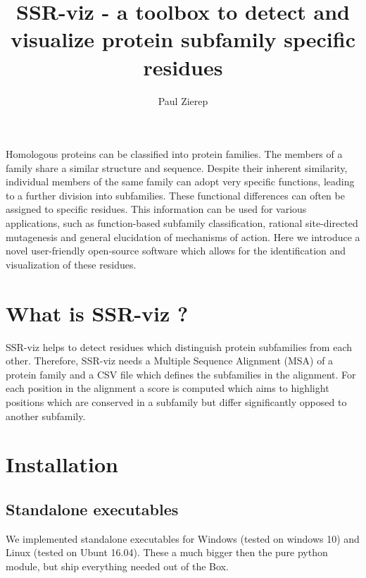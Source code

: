\documentclass[a4paper,10pt]{article}
\title{SSR-viz - a toolbox to detect and visualize protein
subfamily specific residues}
\author{Paul Zierep}
\begin{document}
\maketitle

\begin{abstract}


\end{abstract}

Homologous proteins can be classified into protein families. The members of a family share a similar structure and sequence. Despite their inherent
similarity, individual members of the same family can adopt very specific functions, leading to a further division into subfamilies. These functional
differences can often be assigned to specific residues. This information can be used for various applications, such as function-based subfamily
classification, rational site-directed mutagenesis and general elucidation of mechanisms of action. Here we introduce a novel user-friendly open-source
software which allows for the identification and visualization of these residues.

\pagebreak
\tableofcontents
\pagebreak

\section{What is SSR-viz ?}

SSR-viz helps to detect residues which distinguish protein subfamilies from each other.
Therefore, SSR-viz needs a Multiple Sequence Alignment (MSA) of a protein family and a CSV file which defines the 
subfamilies in the alignment.
For each position in the alignment a score is computed which aims to highlight positions which are conserved in a 
subfamily but differ significantly opposed to another subfamily. 

\section{Installation}

\subsection{Standalone executables}

We implemented standalone 
executables for Windows (tested on windows 10) and Linux (tested on Ubunt 16.04).
These a much bigger then the pure python module, but ship everything needed out of
the Box. \\
\end{document}
